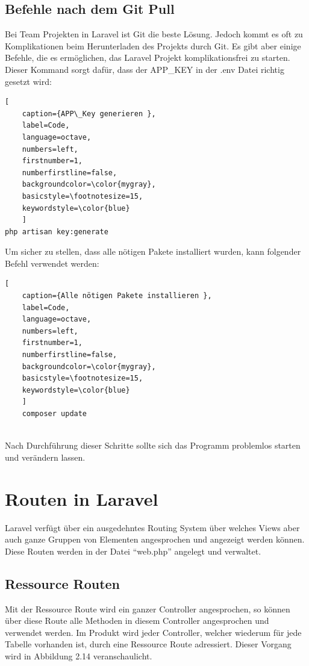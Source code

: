 \subsection{Befehle nach dem Git Pull} 
Bei Team Projekten in Laravel ist Git die beste Lösung. Jedoch kommt es oft zu Komplikationen beim Herunterladen des Projekts durch Git. Es gibt aber einige Befehle, die es ermöglichen, das Laravel Projekt komplikationsfrei zu starten.
Dieser Kommand sorgt dafür, dass der APP\_KEY in der .env Datei richtig gesetzt wird:
\begin{lstlisting}[
	caption={APP\_Key generieren },
	label=Code,
	language=octave,
	numbers=left,
	firstnumber=1,
	numberfirstline=false,
	backgroundcolor=\color{mygray},
	basicstyle=\footnotesize=15,
	keywordstyle=\color{blue}
	]
php artisan key:generate 

\end{lstlisting}
Um sicher zu stellen, dass alle nötigen Pakete installiert wurden, kann folgender Befehl verwendet werden:
\begin{lstlisting}[
	caption={Alle nötigen Pakete installieren },
	label=Code,
	language=octave,
	numbers=left,
	firstnumber=1,
	numberfirstline=false,
	backgroundcolor=\color{mygray},
	basicstyle=\footnotesize=15,
	keywordstyle=\color{blue}
	]
	composer update
	
\end{lstlisting}
Nach Durchführung dieser Schritte sollte sich das Programm problemlos starten und verändern lassen.



\section{Routen in Laravel}
Laravel verfügt über ein ausgedehntes Routing System über welches Views aber auch ganze Gruppen von Elementen angesprochen und angezeigt werden können. Diese Routen werden in der Datei “web.php” angelegt und verwaltet.
\subsection{Ressource Routen} 
Mit der Ressource Route wird ein ganzer Controller angesprochen, so können über diese Route alle Methoden in diesem Controller angesprochen und verwendet werden. Im Produkt wird jeder Controller, welcher wiederum für jede Tabelle vorhanden ist, durch eine Ressource Route adressiert. Dieser Vorgang wird in Abbildung 2.14 veranschaulicht.

